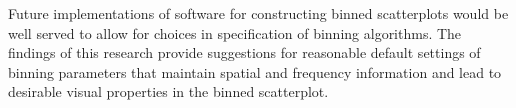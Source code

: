 \documentclass[11pt]{isuthesis}\usepackage[]{graphicx}\usepackage[]{color}
\begin{document}
Future implementations of software for constructing binned scatterplots would be well served to allow for choices in specification of binning algorithms. The findings of this research provide suggestions for reasonable default settings of binning parameters that maintain spatial and frequency information and lead to desirable visual properties in the binned scatterplot.

% 
% 
% 
% 
% 
% 
\end{document}
